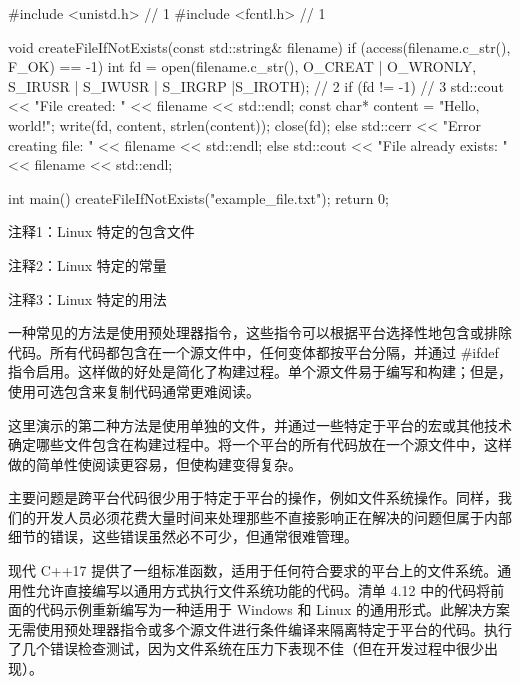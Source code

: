 
\begin{cpp}
#include <unistd.h> // 1
#include <fcntl.h> // 1

void createFileIfNotExists(const std::string& filename) {
  if (access(filename.c_str(), F_OK) == -1) {
    int fd = open(filename.c_str(), O_CREAT | O_WRONLY, S_IRUSR
         | S_IWUSR | S_IRGRP |S_IROTH); // 2
    if (fd != -1) { // 3
      std::cout << "File created: " << filename << std::endl;
      const char* content = "Hello, world!\n";
      write(fd, content, strlen(content));
      close(fd);
    } else
      std::cerr << "Error creating file: " << filename << std::endl;
    } else
      std::cout << "File already exists: " << filename << std::endl;
}

int main() {
  createFileIfNotExists("example_file.txt");
  return 0;
}
\end{cpp}

{\footnotesize
注释1：Linux 特定的包含文件

注释2：Linux 特定的常量

注释3：Linux 特定的用法
}


一种常见的方法是使用预处理器指令，这些指令可以根据平台选择性地包含或排除代码。所有代码都包含在一个源文件中，任何变体都按平台分隔，并通过 \#ifdef 指令启用。这样做的好处是简化了构建过程。单个源文件易于编写和构建；但是，使用可选包含来复制代码通常更难阅读。

这里演示的第二种方法是使用单独的文件，并通过一些特定于平台的宏或其他技术确定哪些文件包含在构建过程中。将一个平台的所有代码放在一个源文件中，这样做的简单性使阅读更容易，但使构建变得复杂。

主要问题是跨平台代码很少用于特定于平台的操作，例如文件系统操作。同样，我们的开发人员必须花费大量时间来处理那些不直接影响正在解决的问题但属于内部细节的错误，这些错误虽然必不可少，但通常很难管理。


现代 C++17 提供了一组标准函数，适用于任何符合要求的平台上的文件系统。通用性允许直接编写以通用方式执行文件系统功能的代码。清单 4.12 中的代码将前面的代码示例重新编写为一种适用于 Windows 和 Linux 的通用形式。此解决方案无需使用预处理器指令或多个源文件进行条件编译来隔离特定于平台的代码。执行了几个错误检查测试，因为文件系统在压力下表现不佳（但在开发过程中很少出现）。


